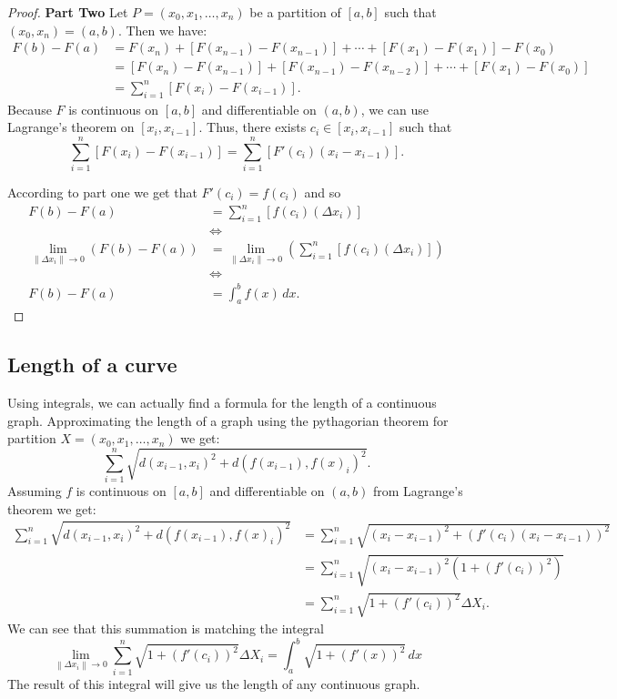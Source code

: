 \documentclass[11pt,a4paper]{article}
\theoremstyle{definition}
\theoremstyle{plain}
\newcommand{\norm}[1]{\left\lVert #1\right\rVert}
\begin{document}
  \begin{proof}
  \textbf{Part Two}
  Let $P = (x_0, x_1, \ldots, x_n)$ be a partition of $[a,b]$ such 
  that $(x_0,x_n) = (a,b)$.
  Then we have:
  \begin{align*}
    F(b) - F(a) &= F(x_n) + \left[F(x_{n-1})-F(x_{n-1})\right] 
    + \cdots + \left[F(x_{1})-F(x_{1})\right] - F(x_0) \\
    &= \left[F(x_n)-F(x_{n-1})\right] + \left[F(x_{n-1})-F(x_{n-2})\right] 
    + \cdots + \left[F(x_1)-F(x_{0})\right] \\
    &= \sum_{i=1}^n{\left[F(x_{i})-F(x_{i-1})\right]}.
  \end{align*}
  Because $F$ is continuous on $[a,b]$ and differentiable on $(a,b)$, we can
  use Lagrange's theorem on $[x_i,x_{i-1}]$.
  Thus, there exists $c_i \in [x_i,x_{i-1}]$ such that
  \[
    \sum_{i=1}^n{\left[F(x_{i})-F(x_{i-1})\right]} 
    = \sum_{i=1}^n{\left[F'(c_i)(x_i-x_{i-1})\right]}.
  \]
  
  According to part one we get that $F'(c_i) = f(c_i)$ and so
  \begin{align*}
    F(b) - F(a) &= \sum_{i=1}^{n}{\left[f(c_i)(\Delta x_i)\right]} \\
    &\iff \\
    \lim_{\|\Delta x_i\|\to 0}{\left(F(b)-F(a)\right)} &= 
    \lim_{\|\Delta x_i\|\to 0}
    {\left(\sum_{i=1}^n{\left[f(c_i)(\Delta x_i)\right]}\right)} \\
    &\iff \\
    F(b)-F(a) &= \int_{a}^{b} f(x)\,dx.
  \end{align*}
  \end{proof}
  
  \subsection{Length of a curve}
  Using integrals, we can actually find a formula for the length of a 
  continuous graph.
  Approximating the length of a graph using the pythagorian theorem for 
  partition $X = (x_0,x_1,\dots,x_n)$ we get:
  \[
    \sum_{i=1}^{n}{\sqrt{d(x_{i-1}, x_i)^2 + d(f(x_{i-1}), f(x)_i)^2}}.
  \]
  Assuming $f$ is continuous on $[a,b]$ and differentiable on $(a,b)$ 
  from Lagrange's theorem we get:
  \begin{align*}
    \sum_{i=1}^{n}{\sqrt{d(x_{i-1}, x_i)^2 + d(f(x_{i-1}), f(x)_i)^2}}
    &= \sum_{i=1}^{n}{\sqrt{(x_i - x_{i-1})^2 + (f'(c_i)(x_{i} - x_{i-1}))^2}}\\
    &= \sum_{i=1}^{n}{\sqrt{(x_i - x_{i-1})^2(1 + (f'(c_i))^2)}} \\
    &= \sum_{i=1}^{n}{\sqrt{1 + (f'(c_i))^2} \Delta X_i}.
  \end{align*}
  We can see that this summation is matching the integral
  \[
    \lim_{\norm{\Delta x_i} \to 0}{\sum_{i=1}^{n}
    {\sqrt{1 + (f'(c_i))^2}\Delta X_i}} = 
    \int_a^b{\sqrt{1 + (f'(x))^2}\,dx}
  \]
  The result of this integral will give us the length of any continuous graph.
\end{document}
